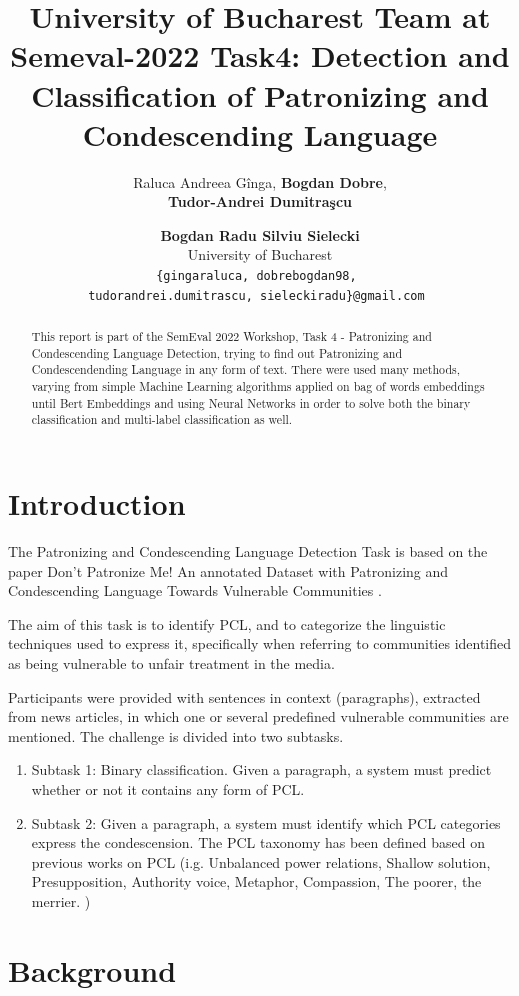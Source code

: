 \documentclass[11pt]{article}
\title{University of Bucharest Team at Semeval-2022 Task4: Detection and
	Classification of Patronizing and Condescending Language}
\author{Raluca Andreea G\^inga, {\bf Bogdan Dobre},  \\  {\bf Tudor-Andrei Dumitra\c{s}cu} \and {\bf Bogdan Radu Silviu Sielecki}\\
    University of Bucharest \\
\texttt{\{gingaraluca, dobrebogdan98, }\\
\texttt{tudorandrei.dumitrascu, sieleckiradu\}@gmail.com }
}
\begin{document}
\maketitle

\begin{abstract}
	This report is part of the SemEval 2022 Workshop, Task 4 - Patronizing and
	Condescending Language Detection, trying to find out Patronizing and
	Condescendending Language in any form of text. There were used many methods,
	varying from simple Machine Learning algorithms applied on bag of words
	embeddings until Bert Embeddings and using Neural Networks in order to solve
	both the binary classification and multi-label classification as well.
\end{abstract}

\section{Introduction}

The Patronizing and Condescending Language Detection Task \cite{perezalmendros2022semeval} is based on the
paper Don't Patronize Me! An annotated Dataset with Patronizing and
Condescending Language Towards Vulnerable Communities \cite{perezalmendros2020dont}.

The aim of this task is to identify PCL, and to categorize the linguistic
techniques used to express it, specifically when referring to communities
identified as being vulnerable to unfair treatment in the media.

Participants were provided with sentences in context (paragraphs), extracted
from news articles, in which one or several predefined vulnerable
communities are mentioned. The challenge is divided into two subtasks.

\begin{enumerate}
	\item Subtask 1: Binary classification. Given a paragraph, a system must
	      predict whether or not it contains any form of PCL.

	\item Subtask 2: Given a paragraph, a system must identify which PCL
	      categories express the condescension. The PCL taxonomy has been defined
	      based on previous works on PCL (i.g. Unbalanced power relations, Shallow
          solution, Presupposition, Authority voice, Metaphor, Compassion, The poorer,
          the merrier. )
\end{enumerate}


\section{Background}
\end{document}
